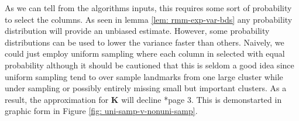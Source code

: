As we can tell from the algorithms inputs, this requires some sort of probability to select the columns. As seen in lemma \ref{lem: rmm-exp-var-bds} any probability distribution will provide an unbiased estimate. However, some probability distributions can be used to lower the variance faster than others. Naively, we could just employ uniform sampling where each column in selected with equal probability although it should be cautioned that this is seldom a good idea since uniform sampling tend to over sample landmarks from one large cluster while under sampling or possibly entirely missing small but important clusters. As a result, the approximation for $\bm{K}$ will decline \cite{musco2017recursive}*{page 3}. This is demonstarted in graphic form in Figure \ref{fig: uni-samp-v-nonuni-samp}.
\begin{figure}[h]
    \centering
     \qquad
\end{figure}
